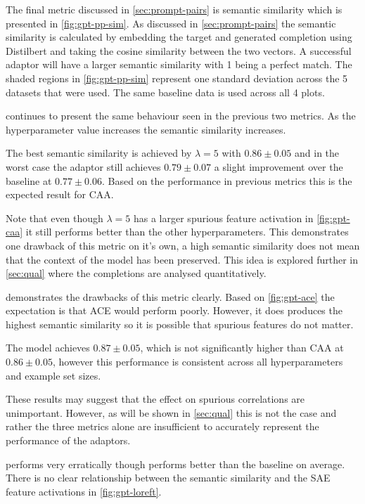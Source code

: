The final metric discussed in \cref{sec:prompt-pairs} is semantic similarity which is presented in \cref{fig:gpt-pp-sim}.
As discussed in \cref{sec:prompt-pairs} the semantic similarity is calculated by embedding the target and generated completion using Distilbert \citep{distilbert} and taking the cosine similarity between the two vectors.
A successful adaptor will have a larger semantic similarity with 1 being a perfect match.
The shaded regions in \cref{fig:gpt-pp-sim} represent one standard deviation across the 5 datasets that were used.
The same baseline data is used across all 4 plots.

 continues to present the same behaviour seen in the previous two metrics.
As the hyperparameter value increases the semantic similarity increases.

The best semantic similarity is achieved by $\lambda = 5$ with $0.86 \pm 0.05$ and in the worst case the adaptor still achieves $0.79 \pm 0.07$ a slight improvement over the baseline at $0.77 \pm 0.06$.
Based on the performance in previous metrics this is the expected result for CAA.

Note that even though $\lambda = 5$ has a larger spurious feature activation in \cref{fig:gpt-caa} it still performs better than the other hyperparameters.
This demonstrates one drawback of this metric on it's own, a high semantic similarity does not mean that the context of the model has been preserved.
This idea is explored further in \cref{sec:qual} where the completions are analysed quantitatively.

 demonstrates the drawbacks of this metric clearly.
Based on \cref{fig:gpt-ace} the expectation is that ACE would perform poorly.
However, it does produces the highest semantic similarity so it is possible that spurious features do not matter.

The model achieves $0.87 \pm 0.05$, which is not significantly higher than CAA at $0.86 \pm 0.05$, however this performance is consistent across all hyperparameters and example set sizes.

These results may suggest that the effect on spurious correlations are unimportant.
However, as will be shown in \cref{sec:qual} this is not the case and rather the three metrics alone are insufficient to accurately represent the performance of the adaptors.

 performs very erratically though performs better than the baseline on average.
There is no clear relationship between the semantic similarity and the SAE feature activations in \cref{fig:gpt-loreft}.

